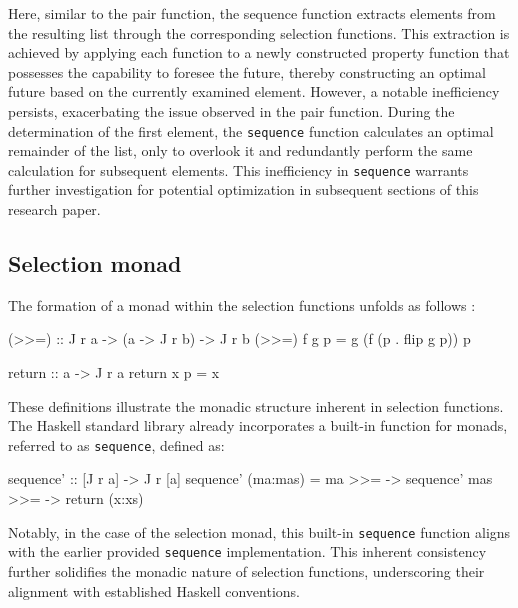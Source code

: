 \documentclass[runningheads]{llncs}
\begin{document}
Here, similar to the pair function, the sequence function extracts
elements from the resulting list through the corresponding selection
functions. This extraction is achieved by applying each function to a
newly constructed property function that possesses the capability to
foresee the future, thereby constructing an optimal future based on the
currently examined element. However, a notable inefficiency persists,
exacerbating the issue observed in the pair function. During the
determination of the first element, the \texttt{sequence} function
calculates an optimal remainder of the list, only to overlook it and
redundantly perform the same calculation for subsequent elements. This
inefficiency in \texttt{sequence} warrants further investigation for
potential optimization in subsequent sections of this research paper.

\subsection{Selection monad}\label{selection-monad}

The formation of a monad within the selection functions unfolds as
follows \cite{escardo2010selection}:

\begin{code}
(>>=) :: J r a -> (a -> J r b) -> J r b
(>>=) f g p = g (f (p . flip g p)) p
\end{code}

\begin{code}
return :: a -> J r a
return x p = x
\end{code}

These definitions illustrate the monadic structure inherent in selection
functions. The Haskell standard library already incorporates a built-in
function for monads, referred to as \texttt{sequence\textquotesingle{}},
defined as:

\begin{code}
sequence' :: [J r a] -> J r [a]
sequence' (ma:mas) = ma >>= 
                    \x -> sequence' mas >>= 
                    \xs -> return (x:xs)
\end{code}

Notably, in the case of the selection monad, this built-in
\texttt{sequence\textquotesingle{}} function aligns with the earlier
provided \texttt{sequence} implementation. This inherent consistency
further solidifies the monadic nature of selection functions,
underscoring their alignment with established Haskell conventions.
\end{document}
